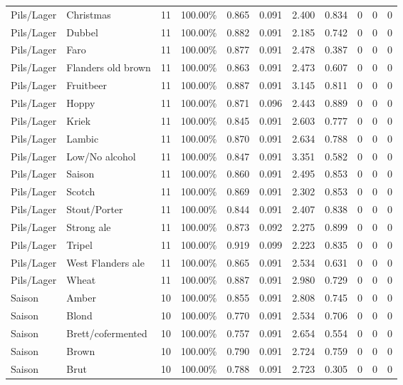{\begin{longtable}{llrrrrrrrrr}
Pils/Lager & Christmas & 11 & 100.00\% & 0.865 & 0.091 & 2.400 & 0.834 & 0 & 0 & 0 \\
Pils/Lager & Dubbel & 11 & 100.00\% & 0.882 & 0.091 & 2.185 & 0.742 & 0 & 0 & 0 \\
Pils/Lager & Faro & 11 & 100.00\% & 0.877 & 0.091 & 2.478 & 0.387 & 0 & 0 & 0 \\
Pils/Lager & Flanders old brown & 11 & 100.00\% & 0.863 & 0.091 & 2.473 & 0.607 & 0 & 0 & 0 \\
Pils/Lager & Fruitbeer & 11 & 100.00\% & 0.887 & 0.091 & 3.145 & 0.811 & 0 & 0 & 0 \\
Pils/Lager & Hoppy & 11 & 100.00\% & 0.871 & 0.096 & 2.443 & 0.889 & 0 & 0 & 0 \\
Pils/Lager & Kriek & 11 & 100.00\% & 0.845 & 0.091 & 2.603 & 0.777 & 0 & 0 & 0 \\
Pils/Lager & Lambic & 11 & 100.00\% & 0.870 & 0.091 & 2.634 & 0.788 & 0 & 0 & 0 \\
Pils/Lager & Low/No alcohol & 11 & 100.00\% & 0.847 & 0.091 & 3.351 & 0.582 & 0 & 0 & 0 \\
Pils/Lager & Saison & 11 & 100.00\% & 0.860 & 0.091 & 2.495 & 0.853 & 0 & 0 & 0 \\
Pils/Lager & Scotch & 11 & 100.00\% & 0.869 & 0.091 & 2.302 & 0.853 & 0 & 0 & 0 \\
Pils/Lager & Stout/Porter & 11 & 100.00\% & 0.844 & 0.091 & 2.407 & 0.838 & 0 & 0 & 0 \\
Pils/Lager & Strong ale & 11 & 100.00\% & 0.873 & 0.092 & 2.275 & 0.899 & 0 & 0 & 0 \\
Pils/Lager & Tripel & 11 & 100.00\% & 0.919 & 0.099 & 2.223 & 0.835 & 0 & 0 & 0 \\
Pils/Lager & West Flanders ale & 11 & 100.00\% & 0.865 & 0.091 & 2.534 & 0.631 & 0 & 0 & 0 \\
Pils/Lager & Wheat & 11 & 100.00\% & 0.887 & 0.091 & 2.980 & 0.729 & 0 & 0 & 0 \\
Saison & Amber & 10 & 100.00\% & 0.855 & 0.091 & 2.808 & 0.745 & 0 & 0 & 0 \\
Saison & Blond & 10 & 100.00\% & 0.770 & 0.091 & 2.534 & 0.706 & 0 & 0 & 0 \\
Saison & Brett/cofermented & 10 & 100.00\% & 0.757 & 0.091 & 2.654 & 0.554 & 0 & 0 & 0 \\
Saison & Brown & 10 & 100.00\% & 0.790 & 0.091 & 2.724 & 0.759 & 0 & 0 & 0 \\
Saison & Brut & 10 & 100.00\% & 0.788 & 0.091 & 2.723 & 0.305 & 0 & 0 & 0 \\

\end{longtable}}
